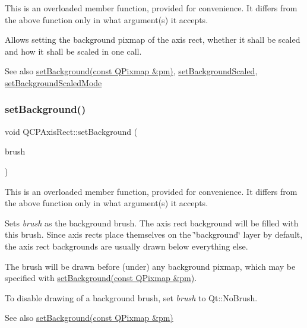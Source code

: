This is an overloaded member function, provided for convenience. It differs from the above function only in what argument(s) it accepts.

Allows setting the background pixmap of the axis rect, whether it shall be scaled and how it shall be scaled in one call.

\begin{DoxySeeAlso}{See also}
\hyperlink{class_q_c_p_axis_rect_af615ab5e52b8e0a9a0eff415b6559db5}{set\+Background(const Q\+Pixmap \&pm)}, \hyperlink{class_q_c_p_axis_rect_ae6d36c3e0e968ffb991170a018e7b503}{set\+Background\+Scaled}, \hyperlink{class_q_c_p_axis_rect_a5ef77ea829c9de7ba248e473f48f7305}{set\+Background\+Scaled\+Mode} 
\end{DoxySeeAlso}
\hypertarget{class_q_c_p_axis_rect_a22a22b8668735438dc06f9a55fe46b33}{}\label{class_q_c_p_axis_rect_a22a22b8668735438dc06f9a55fe46b33} 
\subsubsection{\texorpdfstring{set\+Background()}{setBackground()}\hspace{0.1cm}{\footnotesize\ttfamily [3/3]}}
{\footnotesize\ttfamily void Q\+C\+P\+Axis\+Rect\+::set\+Background (\begin{DoxyParamCaption}\item[{const Q\+Brush \&}]{brush }\end{DoxyParamCaption})}

This is an overloaded member function, provided for convenience. It differs from the above function only in what argument(s) it accepts.

Sets {\itshape brush} as the background brush. The axis rect background will be filled with this brush. Since axis rects place themselves on the \char`\"{}background\char`\"{} layer by default, the axis rect backgrounds are usually drawn below everything else.

The brush will be drawn before (under) any background pixmap, which may be specified with \hyperlink{class_q_c_p_axis_rect_af615ab5e52b8e0a9a0eff415b6559db5}{set\+Background(const Q\+Pixmap \&pm)}.

To disable drawing of a background brush, set {\itshape brush} to Qt\+::\+No\+Brush.

\begin{DoxySeeAlso}{See also}
\hyperlink{class_q_c_p_axis_rect_af615ab5e52b8e0a9a0eff415b6559db5}{set\+Background(const Q\+Pixmap \&pm)} 
\end{DoxySeeAlso}
\hypertarget{class_q_c_p_axis_rect_ae6d36c3e0e968ffb991170a018e7b503}{}\label{class_q_c_p_axis_rect_ae6d36c3e0e968ffb991170a018e7b503} 
